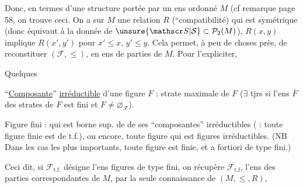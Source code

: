 Donc, en termes d'une structure portée par un ens ordonné $M$ (cf remarque page 58, on trouve ceci. On a sur  $M$ une relation $R$ (``compatibilité) qui est  symétrique (donc équivaut à la donnée de $\unsure{\mathscr S|\mathcal S}\subset\mathcal P_2(M)$),  $R(x,y)$ implique $R(x',y')$ pour $x'\leq x$, $y'\leq y$.  Cela permet, à peu de choses près, de reconstituer $(\mathcal F,\leq)$, en ens de parties de $M$. Pour l'expliciter,

Quelques 

``\uline{Composante}'' \uline{irréductible}  d'une figure $F$ : strate maximale de $F$ ($\exists$ tjrs si l'ens $\overline F$ des strates de $F$ est fini  et $F\ne\varnothing_{\mathcal F}$).

Figure  fini : qui est borne sup. de  de ses ``composantes'' irréductibles ( : toute figure finie est de t.f.), ou encore, toute figure  qui est  figures irréductibles.  (NB Dans les cas les plus importants, toute figure est finie, et a fortiori de type fini.)

Ceci dit, si $\mathcal F_{\mathrm{t.f.}}$ désigne l'ens figures de type fini, on récupère $\overline{\mathcal F_{\mathrm{t.f}}}$, l'ens des parties correspondantes de $M$, par la seule connaissance de $(M,\leq,R)$,
